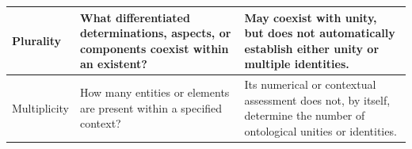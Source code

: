 \begin{table}[htbp]
\begin{tabular}{
|p{}
|p{}
|p{}|
}
Plurality
&
What differentiated determinations, aspects, or components coexist within an existent?
&
May coexist with unity, but does not automatically establish either unity or multiple identities.
\\
\hline

Multiplicity
&
How many entities or elements are present within a specified context?
&
Its numerical or contextual assessment does not, by itself, determine the number of ontological unities or identities.
\\
\hline

\end{tabular}

\end{table}